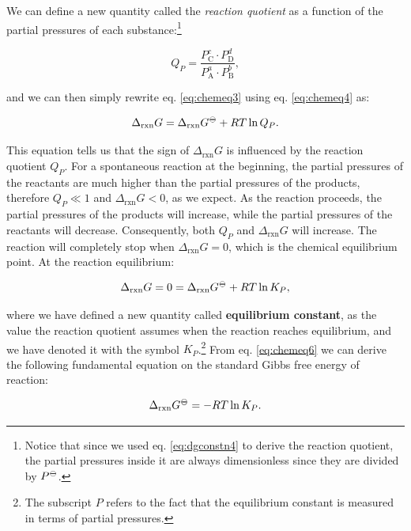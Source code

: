 \documentclass[
  9pt,
]{extbook}
\theoremstyle{definition}
\theoremstyle{definition}
\theoremstyle{definition}
\theoremstyle{remark}
\begin{document}
We can define a new quantity called the \emph{reaction quotient} as a function of the partial pressures of each substance:\footnote{Notice that since we used eq. \eqref{eq:dgconstn4} to derive the reaction quotient, the partial pressures inside it are always dimensionless since they are divided by \(P^{-\kern-6pt{\ominus}\kern-6pt-}\).}

\begin{equation}
Q_P = \frac{P_{\text{C}}^c \cdot P_{\text{D}}^d}{P_{\text{A}}^a \cdot P_{\text{B}}^b},
\label{eq:chemeq4}
\end{equation}

and we can then simply rewrite eq. \eqref{eq:chemeq3} using eq. \eqref{eq:chemeq4} as:

\begin{equation}
\Delta_{\text{rxn}} G = \Delta_{\text{rxn}} G^{-\kern-6pt{\ominus}\kern-6pt-}+ RT \ln Q_P.
\label{eq:chemeq5}
\end{equation}

This equation tells us that the sign of \(\Delta_{\text{rxn}} G\) is influenced by the reaction quotient \(Q_P\). For a spontaneous reaction at the beginning, the partial pressures of the reactants are much higher than the partial pressures of the products, therefore \(Q_P \ll 1\) and \(\Delta_{\text{rxn}} G < 0\), as we expect. As the reaction proceeds, the partial pressures of the products will increase, while the partial pressures of the reactants will decrease. Consequently, both \(Q_P\) and \(\Delta_{\text{rxn}} G\) will increase. The reaction will completely stop when \(\Delta_{\text{rxn}} G = 0\), which is the chemical equilibrium point. At the reaction equilibrium:

\begin{equation}
\Delta_{\text{rxn}} G = 0 = \Delta_{\text{rxn}} G^{-\kern-6pt{\ominus}\kern-6pt-}+ RT \ln K_P,
\label{eq:chemeq6}
\end{equation}

where we have defined a new quantity called \textbf{equilibrium constant}, as the value the reaction quotient assumes when the reaction reaches equilibrium, and we have denoted it with the symbol \(K_P\).\footnote{The subscript \(P\) refers to the fact that the equilibrium constant is measured in terms of partial pressures.} From eq. \eqref{eq:chemeq6} we can derive the following fundamental equation on the standard Gibbs free energy of reaction:

\begin{equation}
\Delta_{\text{rxn}} G^{-\kern-6pt{\ominus}\kern-6pt-}= - RT \ln K_P.
\label{eq:chemeqdg0}
\end{equation}
\end{document}

